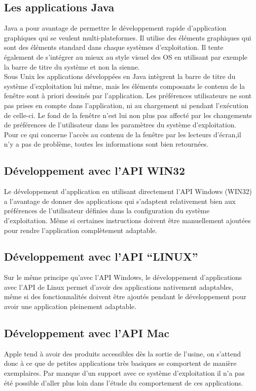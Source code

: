 \documentclass[french,a4paper]{report}
\begin{document}
{\subsection{Les applications Java}
Java a pour avantage de permettre le développement rapide d'application graphiques qui se
veulent multi-plateformes. Il utilise des éléments graphiques qui sont des éléments standard dans
chaque systèmes d'exploitation. Il tente également de s'intégrer au mieux au style visuel des OS en
utilisant par exemple la barre de titre du système et non la sienne. \\
Sous Unix les applications développées en Java intègrent la barre de titre
du système d'exploitation lui même, mais les éléments composants le contenu de la fenêtre sont
à priori dessinés par l'application. Les préférences utilisateurs ne sont pas
prises en compte dans
l'application, ni au chargement ni pendant l'exécution de celle-ci. Le fond de la fenêtre n'est
lui non plus pas affecté par les changements de préférences de l'utilisateur dans les paramètres
du système d'exploitation. \\
Pour ce qui concerne l'accès au contenu de la fenêtre par les lecteurs d'écran,il n'y a pas de
problème, toutes les informations sont bien retournées.
\subsection{Développement avec l'API WIN32}
Le développement d'application en utilisant directement l'API Windows (WIN32) a l'avantage de
donner des applications qui s'adaptent relativement bien aux préférences de l'utilisateur définies
dans la configuration du système d'exploitation. Même si certaines instructions doivent être
manuellement ajoutées pour rendre l'application complètement adaptable.
\subsection{Développement avec l'API \enquote{LINUX}}
Sur le même principe qu'avec l'API Windows, le développement d'applications avec l'API de
Linux
permet d'avoir des applications nativement adaptables, même si des fonctionnalités
doivent être ajoutés pendant le développement pour avoir une application pleinement adaptable.
\subsection{Développement avec l'API Mac}
Apple tend à avoir des produits accessibles dès la sortie de l'usine, on s'attend donc à ce que
de petites applications très basiques se comportent de manière exemplaires. Par manque d'un support
avec ce système d'exploitation il n'a pas été possible d'aller plus loin dans l'étude du
comportement de ces applications.
}
\end{document}
